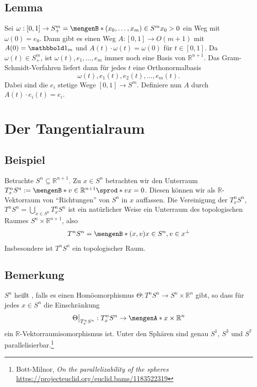 \subsection[Lemma für Satz \ref{sub:177}]{Lemma} %
\label{sub:178}
Sei $\omega : [0,1] \to S^m_+ = \set[(x_0, \ldots , x_m) \in S^m]{x_0 >0}$ ein Weg mit $\omega(0)=e_0$. Dann gibt es einen Weg $A : [0,1] \to O(m+1)$ mit $A(0)=\ind_m$
und $A(t) \cdot \omega(t) = \omega(0)$ für $t \in [0,1]$.
Da $\omega(t) \in S^m_+$, ist $\omega(t), e_1, \ldots ,e_m$ immer noch eine Basis von $\mathds{R}^{n+1}$. Das Gram-Schmidt-Verfahren liefert dann für jedes $t$ eine 
Orthonormalbasis 
\[
	\omega(t), e_1(t), e_2(t), \ldots , e_m(t).
\]
Dabei sind die $e_i$ stetige Wege $[0,1] \to S^m$. Definiere nun $A$ durch $A(t)\cdot e_i(t) = e_i$. \bewende
\newpage

\section{Der Tangentialraum} %
\label{sec:18}
\subsection[Beispiel: Tangentialraum des $S^n$]{Beispiel} %
\label{sub:181}
Betrachte $S^n \subseteq \mathds{R}^{n+1}$. Zu $x \in S^n$ betrachten wir den Unterraum $T_x^n S^n := \set[v \in \mathds{R}^{n+1}]{\sprod*{v}{x}=0}$. Diesen können wir als
$\mathds{R}$-Vektorraum von \enquote{Richtungen} von $S^n$ in $x$ auffassen. Die Vereinigung der $T^n_x S^n$, $T^n S^n = \bigcup_{x \in S^n}T_x^n S^n$ ist ein natürlicher 
Weise ein Unterraum des topologischen Raumes $S^n \times \mathds{R}^{n+1}$, also
\[
	T^nS^n = \set[(x,v)]{x \in S^n, v \in x^\bot} 
\]
Insbesondere ist $T^n S^n$ ein topologischer Raum.

\subsection[Bemerkung: Parallelisierbarkeit von $S^n$]{Bemerkung} %
\label{sub:182}
$S^n$ heißt , falls es einen Homöomorphismus  $\Theta : T^n S^n\to S^n\times \mathds{R}^n$ gibt, so dass für jedes $x \in S^n$ die Einschränkung 
\[
	\Theta\big|_{T_x^n S^n} : T^n_x S^n \to \set{x}\times \mathds{R}^n 
\]
ein $\mathds{R}$-Vektorraumisomorphismus ist. Unter den Sphären sind genau $S^1$, $S^3$ und $S^7$
parallelisierbar.\footnote{Bott-Milnor, \emph{On the parallelizability of the spheres} \url{https://projecteuclid.org/euclid.bams/1183522319}}

